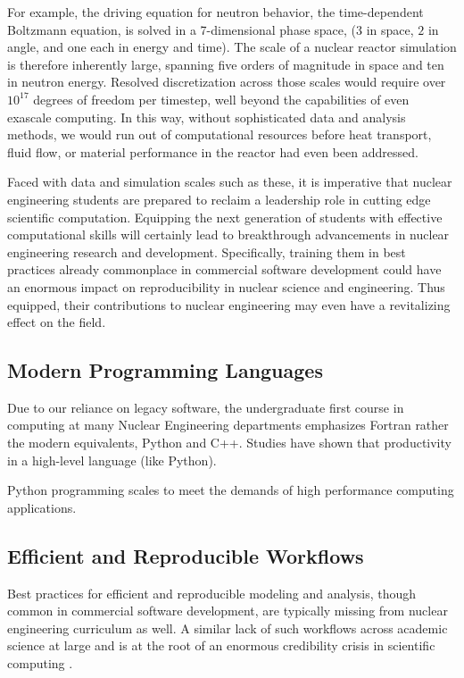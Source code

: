 \documentclass{anstrans}
\begin{document}
For example, the driving equation for neutron behavior, the time-dependent
Boltzmann equation, is solved in a 7-dimensional phase space, ($3$ in space, $2$
in angle, and one each in energy and time). The scale of a nuclear reactor
simulation is therefore inherently large, spanning five orders of magnitude in space and
ten in neutron energy. Resolved discretization across those scales would require
over $10^{17}$ degrees of freedom per timestep, well beyond the
capabilities of even exascale computing. In this way, without sophisticated
data and analysis methods, we would run out of computational resources before
heat transport, fluid flow, or material performance in the reactor had even
been addressed.

Faced with data and simulation scales such as these, it is imperative
that nuclear engineering students are prepared to reclaim a leadership role in
cutting edge scientific computation. Equipping the next generation of
students with effective computational skills will certainly lead to breakthrough
advancements in nuclear engineering research and development.
Specifically, training them in best practices already commonplace in commercial
software development could have an enormous impact on reproducibility in
nuclear science and engineering. Thus equipped, their contributions to nuclear
engineering may even have a revitalizing effect on the field.

\subsection{Modern Programming Languages}

Due to our reliance on legacy software, the undergraduate first course in
computing at many Nuclear Engineering departments emphasizes Fortran
rather the modern equivalents, Python and C++. Studies have shown that
productivity in a high-level language (like Python).

Python programming scales to meet the demands of high performance computing applications.

\subsection{Efficient and Reproducible Workflows}

Best practices for efficient and reproducible modeling and analysis, though
common in commercial software development, are typically missing from nuclear
engineering curriculum as well. A similar lack of such workflows across
academic science at large and is  at the root of an enormous credibility
crisis in scientific computing \cite{donoho, stodden}.
\end{document}
